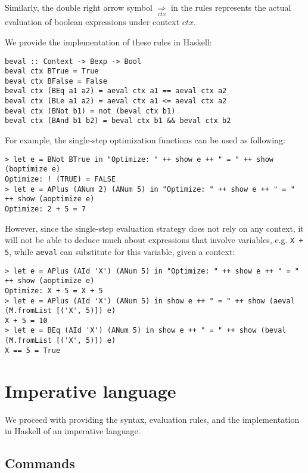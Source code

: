 \documentclass{article}
\begin{document}
Similarly, the double right arrow symbol $\underset{ctx}{\Rightarrow}$ in the rules represents the actual evaluation of boolean expressions under context $ctx$.

We provide the implementation of these rules in Haskell:

\begin{lstlisting}
beval :: Context -> Bexp -> Bool
beval ctx BTrue = True
beval ctx BFalse = False
beval ctx (BEq a1 a2) = aeval ctx a1 == aeval ctx a2
beval ctx (BLe a1 a2) = aeval ctx a1 <= aeval ctx a2
beval ctx (BNot b1) = not (beval ctx b1)
beval ctx (BAnd b1 b2) = beval ctx b1 && beval ctx b2
\end{lstlisting}

For example, the single-step optimization functions can be used as following:

\begin{lstlisting}
> let e = BNot BTrue in "Optimize: " ++ show e ++ " = " ++ show (boptimize e)
Optimize: ! (TRUE) = FALSE
> let e = APlus (ANum 2) (ANum 5) in "Optimize: " ++ show e ++ " = " ++ show (aoptimize e)
Optimize: 2 + 5 = 7
\end{lstlisting}

However, since the single-step evaluation strategy does not rely on any context, it will not be able to deduce much about expressions that involve variables, e.g. \texttt{X + 5}, while \texttt{aeval} can substitute for this variable, given a context:

\begin{lstlisting}
> let e = APlus (AId 'X') (ANum 5) in "Optimize: " ++ show e ++ " = " ++ show (aoptimize e)
Optimize: X + 5 = X + 5
> let e = APlus (AId 'X') (ANum 5) in show e ++ " = " ++ show (aeval (M.fromList [('X', 5)]) e)
X + 5 = 10
> let e = BEq (AId 'X') (ANum 5) in show e ++ " = " ++ show (beval (M.fromList [('X', 5)]) e)
X == 5 = True
\end{lstlisting}

\section{Imperative language}

We proceed with providing the syntax, evaluation rules, and the implementation in Haskell of an imperative language.

\subsection{Commands}
\end{document}
